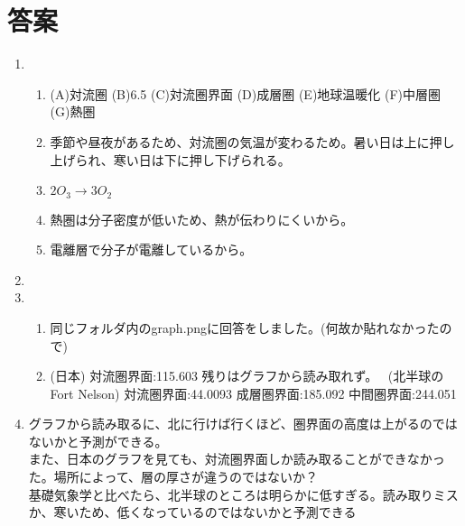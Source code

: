 \documentclass{jsarticle}
\newenvironment{problems}
{
  \renewcommand\labelenumi{\doublebox{\arabic{enumi}}}
  \begin{enumerate}
}{
  \end{enumerate}
  \renewcommand\labelenumi{\arabic{enumi}.}
}
\begin{document}
\section{答案}
\begin{problems}
\item
        \begin{enumerate}[(1)]
        \item
        (A)対流圏
        (B)6.5
        (C)対流圏界面
        (D)成層圏
        (E)地球温暖化
        (F)中層圏
        (G)熱圏
        \item
        季節や昼夜があるため、対流圏の気温が変わるため。暑い日は上に押し上げられ、寒い日は下に押し下げられる。
        \item
        $2O_3 \rightarrow 3O_2$
        \item
        熱圏は分子密度が低いため、熱が伝わりにくいから。
        \item
        電離層で分子が電離しているから。
        \end{enumerate}

\item



\item
        \begin{enumerate}[(1)]
        \item
        同じフォルダ内のgraph.pngに回答をしました。(何故か貼れなかったので)
        \item
        (日本)
        対流圏界面:115.603
        残りはグラフから読み取れず。　
        (北半球のFort Nelson)
        対流圏界面:44.0093
        成層圏界面:185.092
        中間圏界面:244.051
        \end{enumerate}
        \item
        グラフから読み取るに、北に行けば行くほど、圏界面の高度は上がるのではないかと予測ができる。 \\
        また、日本のグラフを見ても、対流圏界面しか読み取ることができなかった。場所によって、層の厚さが違うのではないか？\\
        基礎気象学と比べたら、北半球のところは明らかに低すぎる。読み取りミスか、寒いため、低くなっているのではないかと予測できる

\end{problems}
\end{document}
